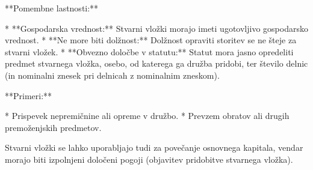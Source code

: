 \documentclass[a4paper,12pt,openright]{book}
\begin{document}
**Pomembne lastnosti:**

* **Gospodarska vrednost:** Stvarni vložki morajo imeti ugotovljivo gospodarsko vrednost.
* **Ne more biti dolžnost:** Dolžnost opraviti storitev se ne šteje za stvarni vložek.
* **Obvezno določbe v statutu:** Statut mora jasno opredeliti predmet stvarnega vložka, osebo, od katerega ga družba pridobi, ter število delnic (in nominalni znesek pri delnicah z nominalnim zneskom).

**Primeri:**

* Prispevek nepremičnine ali opreme v družbo.
* Prevzem obratov ali drugih premoženjskih predmetov.


Stvarni vložki se lahko uporabljajo tudi za povečanje osnovnega kapitala, vendar morajo biti izpolnjeni določeni pogoji (objavitev pridobitve stvarnega vložka).

\cleardoublepage
\end{document}
